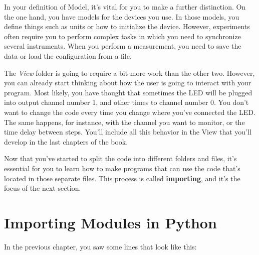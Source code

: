 
In your definition of Model, it's vital for you to make a further distinction. On the one hand, you have models for the devices you use. In those models, you define things such as units or how to initialize the device. However, experiments often require you to perform complex tasks in which you need to synchronize several instruments. When you perform a measurement, you need to save the data or load the configuration from a file.


The \emph{View} folder is going to require a bit more work than the other two. However, you can already start thinking about how the user is going to interact with your program. Most likely, you have thought that sometimes the {LED} will be plugged into output channel number 1, and other times to channel number 0. You don't want to change the code every time you change where you've connected the LED. The same happens, for instance, with the channel you want to monitor, or the time delay between steps. You'll include all this behavior in the View that you'll develop in the last chapters of the book.

Now that you've started to split the code into different folders and files, it's essential for you to learn how to make programs that can use the code that's located in those separate files. This process is called \textbf{importing}, and it's the focus of the next section.

\section{Importing Modules in Python}\label{sec:importing-python}
In the previous chapter, you saw some lines that look like this:

